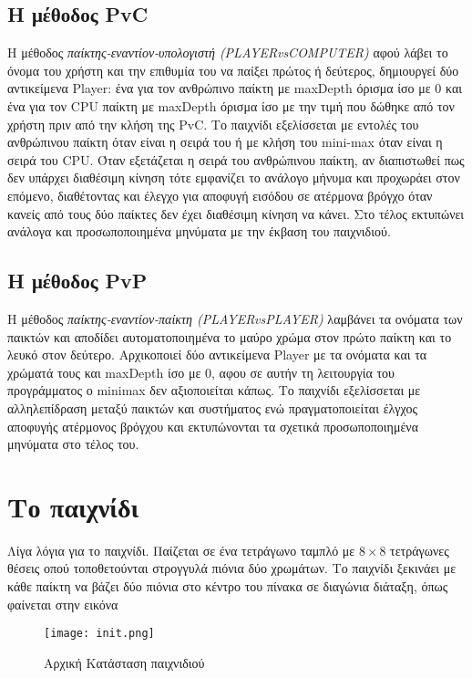 \documentclass[12pt]{article}
\begin{document}
    \subsection{Η μέθοδος PvC}
    Η μέθοδος \textit{παίκτης-εναντίον-υπολογιστή (PLAYERvsCOMPUTER)} αφού λάβει το όνομα του χρήστη και την επιθυμία του να παίξει πρώτος ή δεύτερος, δημιουργεί δύο αντικείμενα Player: ένα για τον ανθρώπινο παίκτη με maxDepth όρισμα ίσο με 0 και ένα για τον CPU παίκτη με maxDepth όρισμα ίσο με την τιμή που δώθηκε από τον χρήστη πριν από την κλήση της PvC. Το παιχνίδι εξελίσσεται με εντολές του ανθρώπινου παίκτη όταν είναι η σειρά του ή με κλήση του mini-max όταν είναι η σειρά του CPU. Όταν εξετάζεται η σειρά του ανθρώπινου παίκτη, αν διαπιστωθεί πως δεν υπάρχει διαθέσιμη κίνηση τότε εμφανίζει το ανάλογο μήνυμα και προχωράει στον επόμενο, διαθέτοντας και έλεγχο για αποφυγή εισόδου σε ατέρμονα βρόγχο όταν κανείς από τους δύο παίκτες δεν έχει διαθέσιμη κίνηση να κάνει. Στο τέλος εκτυπώνει ανάλογα και προσωποποιημένα μηνύματα με την έκβαση του παιχνιδιού.
    
    \subsection{Η μέθοδος PvP}
    Η μέθοδος \textit{παίκτης-εναντίον-παίκτη (PLAYERvsPLAYER)} λαμβάνει τα ονόματα των παικτών και αποδίδει αυτοματοποιημένα το μαύρο χρώμα στον πρώτο παίκτη και το λευκό στον δεύτερο. Αρχικοποιεί δύο αντικείμενα Player με τα ονόματα και τα χρώματά τους και maxDepth ίσο με 0, αφου σε αυτήν τη λειτουργία του προγράμματος ο minimax δεν αξιοποιείται κάπως. Το παιχνίδι εξελίσσεται με αλληλεπίδραση μεταξύ παικτών και συστήματος ενώ πραγματοποιείται έλγχος αποφυγής ατέρμονος βρόγχου και εκτυπώνονται τα σχετικά προσωποποιημένα μηνύματα στο τέλος του. 
\section{Το παιχνίδι}
Λίγα λόγια για το παιχνίδι. Παίζεται σε ένα τετράγωνο ταμπλό με $8\times8$ τετράγωνες θέσεις οπού τοποθετούνται στρογγυλά πιόνια δύο χρωμάτων. Το παιχνίδι ξεκινάει με κάθε παίκτη να βάζει δύο πιόνια στο κέντρο του πίνακα σε διαγώνια διάταξη, όπως φαίνεται στην εικόνα\\

            \begin{figure}[H]
                \centering
                \texttt{[image: init.png]}
                \caption{Αρχική Κατάσταση παιχνιδιού }
            \end{figure}
\end{document}
